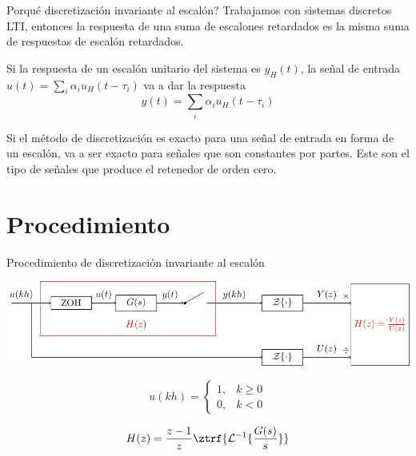 \documentclass[presentation,aspectratio=169]{beamer}
\begin{document}
\begin{frame}[label={sec:org0f6aeb3}]{Porqué discretización invariante al escalón?}
Trabajamos con sistemas discretos LTI, entonces la respuesta de una suma de escalones retardados es la misma suma de respuestas de escalón retardados.

\begin{center}
\end{center}
Si la respuesta de un escalón unitario del sistema es \(y_H(t)\), la señal de entrada  
\(u(t) = \sum_{i} \alpha_i u_H(t-\tau_i)\) va a dar la respuesta \[y(t)=\sum_{i} \alpha_i u_H(t-\tau_i)\]


\begin{tcolorbox}
   Si el método de discretización es exacto para una señal de entrada en forma de un escalón, va a ser exacto para señales que son constantes por partes. Este son el tipo de señales que produce el retenedor de orden cero. 
\end{tcolorbox}
\end{frame}



\section{Procedimiento}
\label{sec:org551cdb7}
\begin{frame}[label={sec:org40383e7}]{Procedimiento de discretización invariante al escalón}
\begin{center}
\includegraphics[width=0.99\linewidth]{../../figures/invariant-sampling.pdf}
\end{center}
\[ u(kh) = \begin{cases} 1, & k \ge 0\\0, & k<0 \end{cases} \]

\begin{tcolorbox}
\[ H(z) = \frac{z-1}{z} \ztrf{\mathcal{L}^{-1}\{ \frac{G(s)}{s} \}} \]
\end{tcolorbox}
\end{frame}
\end{document}
